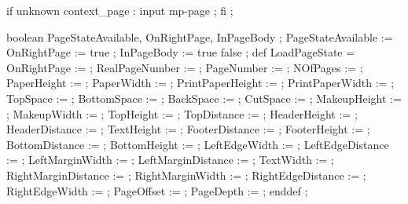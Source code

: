 


\unprotect

\appendtoks
  if unknown context_page : input mp-page ; fi ;
\to \MPinitializations


  boolean PageStateAvailable, OnRightPage, InPageBody ;
  PageStateAvailable := OnRightPage := true ;
  InPageBody         := \ifinpagebody true \else false \fi ;
  def LoadPageState =
    OnRightPage         :=      \MPonrightpage ;
    RealPageNumber      :=  \the\realpageno ;
    PageNumber          :=  \the\pageno ;
    NOfPages            :=      \lastpage ;
    PaperHeight         :=  \the\papierhoogte ;
    PaperWidth          :=  \the\papierbreedte ;
    PrintPaperHeight    :=  \the\printpapierhoogte ;
    PrintPaperWidth     :=  \the\printpapierbreedte ;
    TopSpace            :=  \the\kopwit ;
    BottomSpace         :=  \the\bodemwit ;
    BackSpace           :=  \the\rugwit ;
    CutSpace            :=  \the\snijwit ;
    MakeupHeight        :=  \the\zethoogte ;
    MakeupWidth         :=  \the\zetbreedte ;
    TopHeight           :=  \the\bovenhoogte ;
    TopDistance         := \@the\bovenafstand ;
    HeaderHeight        :=  \the\hoofdhoogte ;
    HeaderDistance      := \@the\hoofdafstand ;
    TextHeight          :=  \the\teksthoogte ;
    FooterDistance      := \@the\voetafstand ;
    FooterHeight        :=  \the\voethoogte ;
    BottomDistance      := \@the\onderafstand ;
    BottomHeight        :=  \the\onderhoogte ;
    LeftEdgeWidth       :=  \the\linkerrandbreedte ;
    LeftEdgeDistance    := \@the\linkerrandafstand ;
    LeftMarginWidth     :=  \the\linkermargebreedte ;
    LeftMarginDistance  := \@the\linkermargeafstand ;
    TextWidth           :=  \the\tekstbreedte ;
    RightMarginDistance := \@the\rechtermargeafstand ;
    RightMarginWidth    :=  \the\rechtermargebreedte ;
    RightEdgeDistance   := \@the\rechterrandafstand ;
    RightEdgeWidth      :=  \the\rechterrandbreedte ;
    PageOffset          :=  \the\pageoffset ;
    PageDepth           :=  \the\pagedepth ;
  enddef ;
\stopuseMPgraphic

